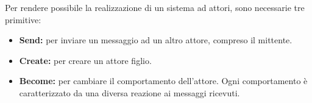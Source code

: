 	Per rendere possibile la realizzazione di un sistema ad attori, sono necessarie tre primitive:
	\begin{itemize}
		\item \textbf{Send:} per inviare un messaggio ad un altro attore, compreso il mittente.
		\item \textbf{Create:} per creare un attore figlio.
		\item \textbf{Become:} per cambiare il comportamento dell'attore. Ogni comportamento è caratterizzato da una diversa reazione ai messaggi ricevuti.
	\end{itemize}


	

